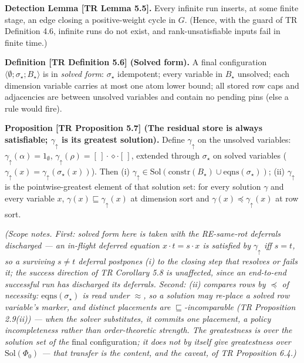 \documentclass[
  10pt,
  letterpaper,
]{article}
\begin{document}
\textbf{Detection Lemma {[}TR Lemma 5.5{]}.} Every infinite run inserts,
at some finite stage, an edge closing a positive-weight cycle in \(G\).
(Hence, with the guard of TR Definition 4.6, infinite runs do not exist,
and rank-unsatisfiable inputs fail in finite time.)

\textbf{Definition {[}TR Definition 5.6{]} (Solved form).} A final
configuration \(\langle \emptyset; \sigma_\star; B_\star \rangle\) is in
\emph{solved form}: \(\sigma_\star\) idempotent; every variable in
\(B_\star\) unsolved; each dimension variable carries at most one atom
lower bound; all stored row caps and adjacencies are between unsolved
variables and contain no pending pins (else a rule would fire).

\textbf{Proposition {[}TR Proposition 5.7{]} (The residual store is
always satisfiable; \(\gamma_\uparrow\) is its greatest solution).}
Define \(\gamma_\uparrow\) on the unsolved variables:
\(\gamma_\uparrow(\alpha) = 1_\emptyset\),
\(\gamma_\uparrow(\rho) = [\,]\cdot\diamond\cdot[\,]\), extended through
\(\sigma_\star\) on solved variables
(\(\gamma_\uparrow(x) = \gamma_\uparrow(\sigma_\star(x))\)). Then (i)
\(\gamma_\uparrow \in \mathrm{Sol}(\mathrm{constr}(B_\star) \cup \mathrm{eqns}(\sigma_\star))\);
(ii) \(\gamma_\uparrow\) is the pointwise-greatest element of that
solution set: for every solution \(\gamma\) and every variable \(x\),
\(\gamma(x) \sqsubseteq \gamma_\uparrow(x)\) at dimension sort and
\(\gamma(x) \preceq \gamma_\uparrow(x)\) at row sort.

\emph{(Scope notes. First: solved form here is taken with the
RE-same-rot deferrals discharged --- an in-flight deferred equation
\(x \cdot t = s \cdot x\) is satisfied by \(\gamma_\uparrow\) iff
\(s = t\), so a surviving \(s \ne t\) deferral postpones (i) to the
closing step that resolves or fails it; the success direction of TR
Corollary 5.8 is unaffected, since an end-to-end successful run has
discharged its deferrals. Second: (ii) compares rows by \(\preceq\) of
necessity: \(\mathrm{eqns}(\sigma_\star)\) is read under \(\approx\), so
a solution may re-place a solved row variable's marker, and distinct
placements are \(\sqsubseteq\)-incomparable (TR Proposition 2.9(ii)) ---
when the solver substitutes, it commits one placement, a policy
incompleteness rather than order-theoretic strength. The greatestness is
over the solution set of the} final configuration\emph{; it does not by
itself give greatestness over \(\mathrm{Sol}(\Phi_0)\) --- that transfer
is the content, and the caveat, of TR Proposition 6.4.)}
\end{document}
